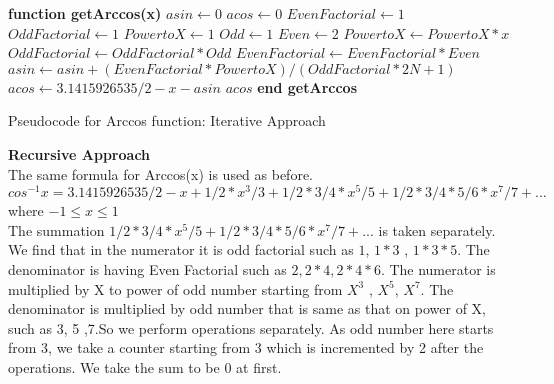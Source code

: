 \documentclass[12pt]{article}
\begin{document}
\begin{algorithm}
\SetAlgoLined
    \textbf{function getArccos(x)\;}
    $asin\gets 0$\;
    $acos\gets 0$\;
         {
            $EvenFactorial\gets 1$\;
            $OddFactorial\gets 1$\;
            $PowertoX\gets 1$\;
            $Odd\gets 1$\;
            $Even\gets 2$\;
            {
                $PowertoX\gets PowertoX * x$\; 
            }
            \EndFor
            {
                $OddFactorial \gets OddFactorial * Odd$\;
            }
            {
                $EvenFactorial \gets EvenFactorial * Even$\;
            }
            $asin \gets asin + (EvenFactorial * PowertoX)/(OddFactorial * 2N+1)$\;
        }
        \EndFor
        $acos \gets 3.1415926535/2 - x - asin$\;
        \Return $acos$\;
        \textbf{end getArccos}
\caption{Pseudocode for Arccos function: Iterative Approach}
\label{algorithm1}
\end{algorithm}
\newpage
\noindent
\textbf{Recursive Approach}\\
The same formula for Arccos(x) is used as before. $cos^{-1}x = 3.1415926535/2 -  x + 1/2 * x^3/3 + 1/2 *3/4 *x^5/5 + 1/2 * 3/4 *5/6 * x^7/7 + ... $ where $-1 \leq x \leq 1$\\
The summation $1/2 *3/4 *x^5/5 + 1/2 * 3/4 *5/6 * x^7/7 + ...$ is taken separately. We find that in the numerator it is odd factorial such as $1$, $1*3$ , $1*3*5$. The denominator is having Even Factorial such as $2, 2*4, 2*4*6$. The numerator is multiplied by X to power of odd number starting from $X^3$ , $X^5$, $X^7$. The denominator is multiplied by odd number that is same as that on power of X, such as 3, 5 ,7.So we perform operations separately. As odd number here starts from 3, we take a counter starting from 3 which is incremented by 2 after the operations. We take the sum to be 0 at first.
\end{document}

